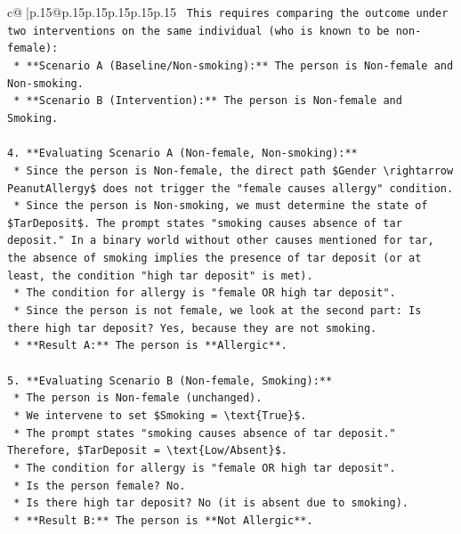 \documentclass{article}
\begin{document}
{\begin{supertabular}{c@{$\;$}|p{.15\linewidth}@{}p{.15\linewidth}p{.15\linewidth}p{.15\linewidth}p{.15\linewidth}p{.15\linewidth}}
{{{\texttt{    This requires comparing the outcome under two interventions on the same individual (who is known to be non{-}female):} \\
\texttt{    *   **Scenario A (Baseline/Non{-}smoking):** The person is Non{-}female and Non{-}smoking.} \\
\texttt{    *   **Scenario B (Intervention):** The person is Non{-}female and Smoking.} \\
\\ 
\texttt{4.  **Evaluating Scenario A (Non{-}female, Non{-}smoking):**} \\
\texttt{    *   Since the person is Non{-}female, the direct path \$Gender \textbackslash{}rightarrow PeanutAllergy\$ does not trigger the "female causes allergy" condition.} \\
\texttt{    *   Since the person is Non{-}smoking, we must determine the state of \$TarDeposit\$. The prompt states "smoking causes absence of tar deposit." In a binary world without other causes mentioned for tar, the absence of smoking implies the presence of tar deposit (or at least, the condition "high tar deposit" is met).} \\
\texttt{    *   The condition for allergy is "female OR high tar deposit".} \\
\texttt{    *   Since the person is not female, we look at the second part: Is there high tar deposit? Yes, because they are not smoking.} \\
\texttt{    *   **Result A:** The person is **Allergic**.} \\
\\ 
\texttt{5.  **Evaluating Scenario B (Non{-}female, Smoking):**} \\
\texttt{    *   The person is Non{-}female (unchanged).} \\
\texttt{    *   We intervene to set \$Smoking = \textbackslash{}text\{True\}\$.} \\
\texttt{    *   The prompt states "smoking causes absence of tar deposit." Therefore, \$TarDeposit = \textbackslash{}text\{Low/Absent\}\$.} \\
\texttt{    *   The condition for allergy is "female OR high tar deposit".} \\
\texttt{    *   Is the person female? No.} \\
\texttt{    *   Is there high tar deposit? No (it is absent due to smoking).} \\
\texttt{    *   **Result B:** The person is **Not Allergic**.} \\
\\ 
}}}
\end{supertabular}}
\end{document}
